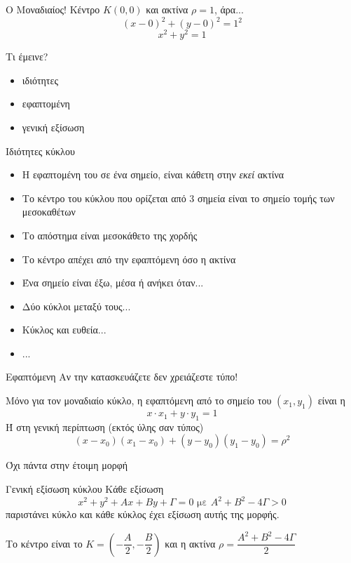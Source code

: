 \documentclass[greek]{beamer}
\begin{document}
\begin{frame}{Ο Μοναδιαίος!}
  Κέντρο $Κ(0,0)$ και ακτίνα $ρ=1$, άρα...
  $$(x-0)^2+(y-0)^2=1^2$$
  $$x^2+y^2=1$$
\end{frame}

\begin{frame}{Τι έμεινε?}
  \begin{itemize}
    \item ιδιότητες
    \item εφαπτομένη
    \item γενική εξίσωση
  \end{itemize}
\end{frame}

\begin{frame}{Ιδιότητες κύκλου}
  \begin{itemize}
    \item<1-> Η εφαπτομένη του σε ένα σημείο, είναι κάθετη στην \emph{εκεί} ακτίνα
    \item<2-> Το κέντρο του κύκλου που ορίζεται από $3$ σημεία είναι το σημείο τομής των μεσοκαθέτων
    \item<3-> Το απόστημα είναι μεσοκάθετο της χορδής
    \item<4-> Το κέντρο απέχει από την εφαπτόμενη όσο η ακτίνα
    \item<5-> Ένα σημείο είναι έξω, μέσα ή ανήκει όταν...
    \item<6-> Δύο κύκλοι μεταξύ τους...
    \item<7-> Κύκλος και ευθεία...
    \item<8-> ...
  \end{itemize}

\end{frame}

\begin{frame}[label=Εφαπτόμενη]{Εφαπτόμενη}
  Αν την κατασκευάζετε δεν χρειάζεστε τύπο!

  Μόνο για τον μοναδιαίο κύκλο, η εφαπτόμενη από το σημείο του $(x_1,y_1)$ είναι η
  $$x\cdot x_1+y\cdot y_1=1$$
  Ή στη γενική περίπτωση (εκτός ύλης σαν τύπος)
  $$(x-x_0)(x_1-x_0)+(y-y_0)(y_1-y_0)=ρ^2$$

  \hyperlink{Απόδειξη}{}
\end{frame}

\begin{frame}[label=ΓενικήΕξίσωση]{Όχι πάντα στην έτοιμη μορφή}

  \begin{block}{Γενική εξίσωση κύκλου}
    Κάθε εξίσωση
    $$x^2+y^2+Αx+Βy+Γ=0\text{ με }Α^2+Β^2-4Γ>0$$
    παριστάνει κύκλο και κάθε κύκλος έχει εξίσωση αυτής της μορφής.

    Το κέντρο είναι το $Κ=(-\dfrac{Α}{2},-\dfrac{Β}{2})$ και η ακτίνα $ρ=\dfrac{Α^2+Β^2-4Γ}{2}$
  \end{block}

  \hyperlink{Απόδειξη2}{}

  \hyperlink{Απόδειξη3}{}
\end{frame}
\end{document}
